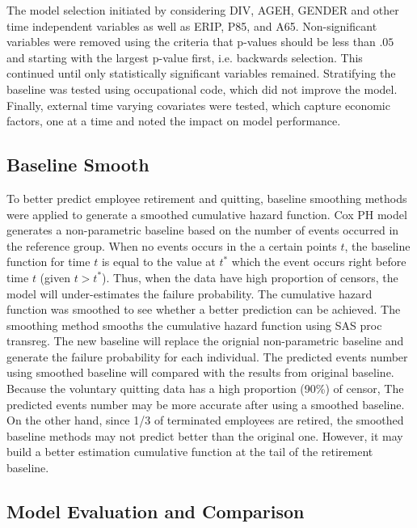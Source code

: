 The model selection initiated by considering DIV, AGEH, GENDER and other time independent variables as well as ERIP, P85, and A65. Non-significant variables were removed using the criteria that p-values should be less than $.05$ and starting with the largest p-value first, i.e. backwards selection.  This continued until only statistically significant variables remained. Stratifying the baseline was tested using occupational code, which did not improve the model. Finally, external time varying covariates were tested, which capture economic factors, one at a time and noted the impact on model performance.

\subsection{Baseline Smooth}
To better predict employee retirement and quitting, baseline smoothing methods were applied to generate a smoothed cumulative hazard function. Cox PH model generates a non-parametric baseline based on the number of events occurred in the reference group. When no events occurs in the a certain points $t$, the baseline function for time $t$ is equal to the value at $t^*$ which the event occurs right before time $t$ (given $t>t^*$). Thus, when the data have high proportion of censors, the model will under-estimates the failure probability. The cumulative hazard function was smoothed to see whether a better prediction can be achieved. The smoothing method smooths the cumulative hazard function using SAS proc transreg. The new baseline will replace the orignial non-parametric baseline and generate the failure probability for each individual. The predicted events number using smoothed baseline will compared with the results from original baseline. Because the voluntary quitting data has a high proportion (90\%) of censor, The predicted events number may be more accurate after using a smoothed baseline. On the other hand, since 1/3 of terminated employees are retired, the smoothed baseline methods may not predict better than the original one. However, it may build a better estimation cumulative function at the tail of the retirement baseline.       

\subsection{Model Evaluation and Comparison}

